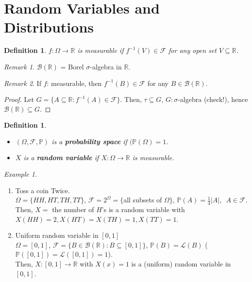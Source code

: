 \documentclass[12pt]{report}
\renewcommand{\1}{\mathbb{1}}
\renewcommand{\subset}{\subseteq}
\theoremstyle{break}
\theoremstyle{newdef}
\newtheorem{defn}[thm]{Definition} %
\theoremstyle{remark}
\newtheorem*{exmp}{Example} %
\newtheorem*{rem}{Remark} %
\begin{document}
\section{Random Variables and Distributions}
\begin{defn}
$f : \Omega \rightarrow \mathbb{R}$ is measurable if $f^{-1}(V) \in \mathcal{F}$ for any open set $V \subset \mathbb{R}$.
\end{defn}

\begin{rem}
$\mathcal{B}(\mathbb{R})$ = Borel $\sigma$-algebra in $\mathbb{R}$.
\end{rem}

\begin{rem}
If $f$: measurable, then $f^{-1}(B) \in \mathcal{F}$ for any $B \in \mathcal{B}(\mathbb{R})$.
\begin{proof}
Let $G = \{ A \subset \mathbb{R} : f^{-1}(A) \in \mathcal{F} \}$.
Then, $\tau \subset G$, $G: \sigma$-algebra (check!), hence $\mathcal{B}(\mathbb{R}) \subset G$.
\end{proof}
\end{rem}


\begin{defn}
\leavevmode
\vspace{-6mm}
\begin{itemize}
\item $(\Omega, \mathcal{F}, \mathbb{P})$ is a \textbf{probability space} if $(\mathbb{P}(\Omega) = 1$.
\item $X$ is a \textbf{random variable} if $X : \Omega \rightarrow \mathbb{R}$ is measurable.
\end{itemize}
\end{defn}

\begin{exmp}
\leavevmode
\begin{enumerate}
\item Toss a coin Twice.\\
$\Omega = \{HH,HT,TH,TT\}$,
$\mathcal{F} = 2^\Omega = \{$all subsets of $\Omega\}$,
$\mathbb{P}(A) = \frac{1}{4}|A|, \enspace A \in \mathcal{F}$.\\
Then, $X = $ the number of $H$'s is a random variable with $X(HH) = 2, X(HT)=X(TH)=1, X(TT)=1$.

\item Uniform random variable in $[0,1]$\\
$\Omega=  [0,1]$,
$\mathcal{F} = \{B \in \mathcal{B}(\mathbb{R}) : B \subset [0,1]\}$,
$\mathbb{P}(B) = \mathcal{L}(B)$ ($\mathbb{P}([0,1]) = \mathcal{L}([0,1]) = 1$).\\
Then, $X : [0,1] \rightarrow \mathbb{R}$ with $X(x) = 1$ is a (uniform) random variable in $[0,1]$.
\end{enumerate}
\end{exmp}
\end{document}
